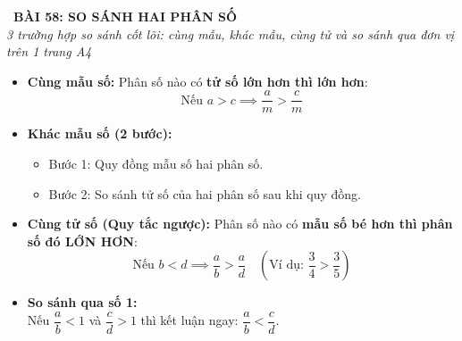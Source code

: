 \documentclass[14pt,a4paper,oneside]{extbook}
\begin{document}
\noindent
\begin{tcolorbox}[
  enhanced,
  colback=teal!8!white,
  colframe=teal!80!black,
  arc=3mm, boxrule=1pt,
  left=3mm, right=3mm, top=2mm, bottom=2mm,
  halign=center
]
  {\Large\bfseries\color{teal!90!black}\faBookmark\ BÀI 58: SO SÁNH HAI PHÂN SỐ}\\[1.5pt]
  {\footnotesize\itshape\color{black!75} 3 trường hợp so sánh cốt lõi: cùng mẫu, khác mẫu, cùng tử và so sánh qua đơn vị trên 1 trang A4}
\end{tcolorbox}

\vspace{-2.5mm}

\noindent
\begin{minipage}[t]{0.49\textwidth}\vspace{0pt}
\begin{tcolorbox}[
  enhanced,
  colback=blue!4!white,
  colframe=blue!75!black,
  arc=2mm, boxrule=0.8pt,
  left=2mm, right=2mm, top=1.8mm, bottom=1.8mm,
  title={\footnotesize\bfseries\color{white}\faSliders\ 1. So sánh cùng mẫu \& Khác mẫu}
]
{\footnotesize
\begin{itemize}\setlength{\itemsep}{1pt}\setlength{\leftskip}{-2.5mm}
  \item \textbf{Cùng mẫu số:} Phân số nào có \textbf{tử số lớn hơn thì lớn hơn}:
  $$\text{Nếu } a > c \implies \dfrac{a}{m} > \dfrac{c}{m}$$
  \item \textbf{Khác mẫu số (2 bước):}
  \begin{itemize}\setlength{\itemsep}{0.5pt}\setlength{\leftskip}{-2.5mm}
    \item Bước 1: Quy đồng mẫu số hai phân số.
    \item Bước 2: So sánh tử số của hai phân số sau khi quy đồng.
  \end{itemize}
\end{itemize}
}
\end{tcolorbox}
\end{minipage}
\hfill
\begin{minipage}[t]{0.49\textwidth}\vspace{0pt}
\begin{tcolorbox}[
  enhanced,
  colback=teal!4!white,
  colframe=teal!75!black,
  arc=2mm, boxrule=0.8pt,
  left=2mm, right=2mm, top=1.8mm, bottom=1.8mm,
  title={\footnotesize\bfseries\color{white}\faRocket\ 2. Kĩ thuật so sánh đặc biệt}
]
{\footnotesize
\begin{itemize}\setlength{\itemsep}{1pt}\setlength{\leftskip}{-2.5mm}
  \item \textbf{Cùng tử số (Quy tắc ngược):} Phân số nào có \textbf{mẫu số bé hơn thì phân số đó LỚN HƠN}:
  $$\text{Nếu } b < d \implies \dfrac{a}{b} > \dfrac{a}{d} \quad (\text{Ví dụ: } \dfrac{3}{4} > \dfrac{3}{5})$$
  \item \textbf{So sánh qua số 1:}\\
  Nếu $\dfrac{a}{b} < 1$ và $\dfrac{c}{d} > 1$ thì kết luận ngay: $\dfrac{a}{b} < \dfrac{c}{d}$.
\end{itemize}
}
\end{tcolorbox}
\end{minipage}
\end{document}
